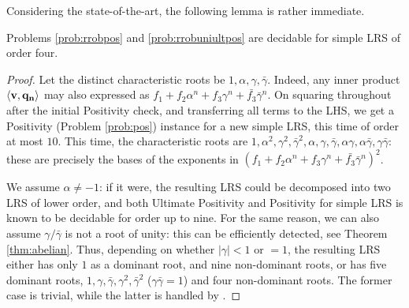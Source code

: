 Considering the state-of-the-art, the following lemma is rather immediate. 
\begin{lemma}
Problems \ref{prob:rrobpos} and \ref{prob:rrobuniultpos} are decidable for simple LRS of order four.
\end{lemma}
\begin{proof}
Let the distinct characteristic roots be $1, \alpha, \gamma, \bar{\gamma}$. Indeed, any inner product $\langle\mathbf{v}, \mathbf{q_n}\rangle$ may also expressed as $f_1 + f_2\alpha^n + f_3 \gamma^n + \bar{f_3}\bar{\gamma}^n$. On squaring throughout after the initial Positivity check, and transferring all terms to the LHS, we get a Positivity (Problem \ref{prob:pos}) instance for a new simple LRS, this time of order at most $10$. This time, the characteristic roots are $1, \alpha^2, \gamma^2, \bar{\gamma}^2, \alpha, \gamma, \bar{\gamma}, \alpha\gamma, \alpha\bar{\gamma}, \gamma\bar{\gamma}$: these are precisely the bases of the exponents in $(f_1 + f_2\alpha^n + f_3 \gamma^n + \bar{f_3}\bar{\gamma}^n)^2$.

We assume $\alpha \ne -1$: if it were, the resulting LRS could be decomposed into two LRS of lower order, and both Ultimate Positivity \cite{ouaknine2014ultimate} and Positivity  \cite{ouaknine2014positivity} for simple LRS is known to be decidable for order up to nine. For the same reason, we can also assume $\gamma/\bar{\gamma}$ is not a root of unity: this can be efficiently detected, see Theorem \ref{thm:abelian}. Thus, depending on whether $|\gamma| < 1$ or $= 1$, the resulting LRS either has only $1$ as a dominant root, and nine non-dominant roots, or has five dominant roots, $1, \gamma, \bar{\gamma}, \gamma^2, \bar{\gamma}^2$ ($\gamma\bar{\gamma} = 1$) and four non-dominant roots. The former case is trivial, while the latter is handled by \cite{ouaknine2014positivity}.
\end{proof}

